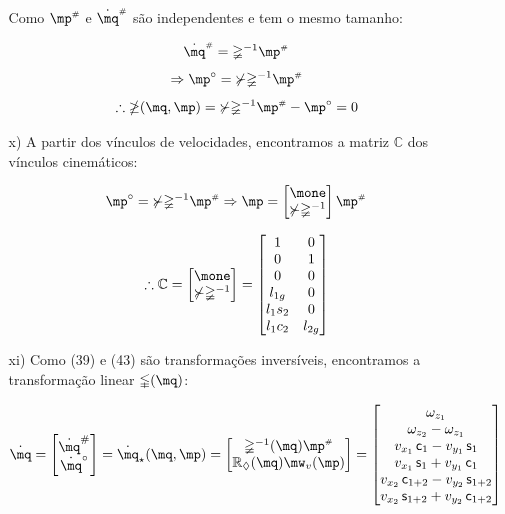 \begin{itemize}
\begin{itemize}
	Como $\mp\ssh$ e $\dot{\mq}\ssh$ s\~ao independentes e tem o mesmo tamanho:

	$$ \dot{\mq}\ssh = \mathbb{\Psi}^{-1} \mp\ssh $$
	$$ \Rightarrow  \mp^\circ = \mathbb{\Upsilon} \mathbb{\Psi}^{-1} \mp\ssh $$
	\begin{equation}
	\therefore \mathbb{\Lambda}(\mq,\mp) = \mathbb{\Upsilon} \mathbb{\Psi}^{-1} \mp\ssh - \mp^\circ  = 0
	\end{equation}
	
	\item[x)] A partir dos v\'inculos de velocidades, encontramos a matriz $\mathbb{C}$ dos v\'inculos cinem\'aticos:
	
	$$ \mp^\circ = \mathbb{\Upsilon} \mathbb{\Psi}^{-1} \mp\ssh \Rightarrow \mp =
	\begin{bmatrix}
	\mone\\
	\mathbb{\Upsilon} \mathbb{\Psi}^{-1}
	\end{bmatrix}
	\mp\ssh
	$$
	
	\begin{equation}
	\therefore \mathbb{C} =
	\begin{bmatrix}
	\mone\\
	\mathbb{\Upsilon} \mathbb{\Psi}^{-1}
	\end{bmatrix}
	=
	\begin{bmatrix}
	1 & 0 \\
	0 & 1 \\
	0 & 0 \\
	l_{1g} & 0\\
	l_1 s_{2} & 0 \\
	l_1 c_{2} & l_{2g} \\
	\end{bmatrix}
	\end{equation}
	
	\item[xi)] Como (39) e (43) s\~ao transforma\c{c}\~oes invers\'iveis, encontramos a transforma\c{c}\~ao linear $\mathbb{\Gamma}(\mq)$:
	
	\begin{equation}
	\dot{\mq} =
	\begin{bmatrix}
	\dot{\mq}^{\#} \\
	\dot{\mq}^\circ \\
	\end{bmatrix}
	= \dot{\mq}_\star(\mq,\mp) =
	\begin{bmatrix}
	\mathbb{\Psi}^{-1} (\mq) \mp\ssh \\
	\mR_\Diamond (\mq) \mw_v (\mp)
	\end{bmatrix}
	=
	\begin{bmatrix}
	\omega_{z_1} \\
	\omega_{z_2}-\omega_{z_1}\\
	v_{x_1} \, \ccos_1 - v_{y_1} \, \ssin_1 \\
	v_{x_1} \, \ssin_1 + v_{y_1} \, \ccos_1 \\
	v_{x_2} \, \ccos_{1+2} - v_{y_2} \, \ssin_{1+2} \\
	v_{x_2} \, \ssin_{1+2} + v_{y_2} \, \ccos_{1+2} \\
	\end{bmatrix}
	\end{equation}
	

\end{itemize}
\end{itemize}
